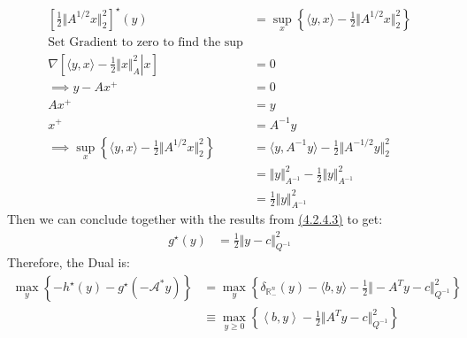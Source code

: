 \documentclass[]{article}
\begin{document}
        \begin{align*}\tag{4.2.4.4}\label{eqn:4.2.4.4}
            \left[
                \frac{1}{2} \Vert A^{1/2}x\Vert_2^2
            \right]^\star(y) &= 
            \sup_{x} \left\lbrace
                \langle y, x\rangle - \frac{1}{2} \Vert A^{1/2}x\Vert_2^2
            \right\rbrace
            \\
            \text{Set Gradient to zero to find the sup}& 
            \\
            \nabla \left[
                \left.
                    \langle y, x\rangle - \frac{1}{2}\Vert x\Vert_A^2
                \right|x
            \right] &= 0
            \\
            \implies y - Ax^+ &= 0
            \\
            Ax^+ &= y
            \\
            x^+&= A^{-1}y
            \\
            \implies
            \sup_{x} \left\lbrace
                \langle y, x\rangle - \frac{1}{2} \Vert A^{1/2}x\Vert_2^2
            \right\rbrace &= 
            \langle y, A^{-1}y\rangle - \frac{1}{2}\Vert A^{-1/2}y\Vert_2^2
            \\
            &= 
            \Vert y\Vert_{A^{-1}}^2 - \frac{1}{2}\Vert y\Vert_{A^{-1}}^2
            \\
            &= 
            \frac{1}{2}\Vert y\Vert_{A^{-1}}^2
        \end{align*}
        Then we can conclude together with the results from \hyperref[eqn:4.2.4.3]{(4.2.4.3)} to get: 
        \begin{align*}\tag{4.2.4.5}\label{eqn:4.2.4.5}
            g^\star(y)  &= \frac{1}{2} \Vert y - c\Vert_{Q^{-1}}^2
        \end{align*}
        Therefore, the Dual is: 
        \begin{align*}\tag{4.2.4.6}\label{eqn:4.2.4.6}
            \max_{y}\left\lbrace
                - h^\star(y) - g^\star(-\mathcal{A}^*y)
            \right\rbrace
            &=
            \max_{y} \left\lbrace
                \delta_{\mathbb{R}_-^n}(y) - \langle b, y\rangle - \frac{1}{2} \Vert -A^Ty - c\Vert_{Q^{-1}}^2
            \right\rbrace
            \\
            &\equiv 
            \max_{y \ge 0} \left\lbrace
                \left\langle b, y \right\rangle - \frac{1}{2}\Vert A^Ty - c\Vert_{Q^{-1}}^2
            \right\rbrace
        \end{align*}
\end{document}
